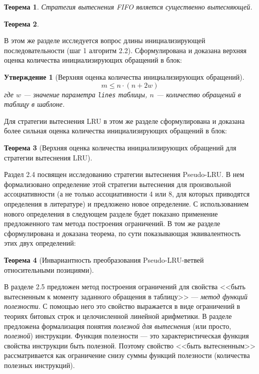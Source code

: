 \documentclass[14pt,autoref,href
,facsimile
]{disser}
\newtheorem{utv}{Утверждение}
\newtheorem{theorem}{Теорема}
\newcommand{\LRU}{LRU\xspace}
\newcommand{\PseudoLRU}{Pseudo-LRU\xspace}
\begin{document}
\begin{theorem}
  Стратегия вытеснения FIFO является существенно вытесняющей.
\end{theorem}

\begin{theorem}\label{thm:PseudoLRU_essential} \PseudoLRUEssential \end{theorem}

В этом же разделе исследуется вопрос длины инициализирующей последовательности (шаг 1 алгоритм 2.2). Сформулирована и доказана верхняя оценка количества инициализирующих обращений в блок:
\begin{utv}[Верхняя оценка количества инициализирующих обращений]
$$m \leqslant n \cdot (n + 2w)$$ где $w$ --- значение параметра \texttt{lines} таблицы, $n$ --- количество обращений в таблицу в шаблоне.
\end{utv}

Для стратегии вытеснения LRU в этом же разделе сформулирована и доказана более сильная оценка количества инициализирующих обращений в блок:
\begin{theorem}[Верхняя оценка количества инициализирующих обращений для
стратегии вытеснения \LRU]\label{thm_mirror_lenth_lru} \UpperBoundLRUMirror
\end{theorem}

Раздел 2.4 посвящен исследованию стратегии вытеснения Pseudo-LRU. В нем формализовано определение этой стратегии вытеснения для произвольной ассоциативности (а не только ассоциативности 4 или 8, для которых приводятся определения в литературе) и предложено новое определение. С использованием нового определения в следующем разделе будет показано применение предложенного там метода построения ограничений. В том же разделе сформулирована и доказана теорема, по сути показывающая эквивалентность этих двух определений:
\begin{theorem}[Инвариантность преобразования \PseudoLRU-ветвей относительными
позициями]\label{thm_pseudoLRU_invariant} \PseudoLRUInvariant
\end{theorem}

В разделе 2.5 предложен метод построения ограничений для свойства <<быть вытесненным к моменту заданного обращения в таблицу>> --- \emph{метод функций полезности}. С помощью него это свойство выражается в виде ограничений в теориях битовых строк и целочисленной линейной арифметики. В разделе предложена формализация понятия \emph{полезной для вытеснения} (или просто, \emph{полезной}) инструкции. Функция полезности --- это характеристическая функция свойства инструкции быть полезной. Поэтому свойство <<быть вытесненным>> рассматривается как ограничение снизу суммы функций полезности (количества полезных инструкций).
\end{document}
